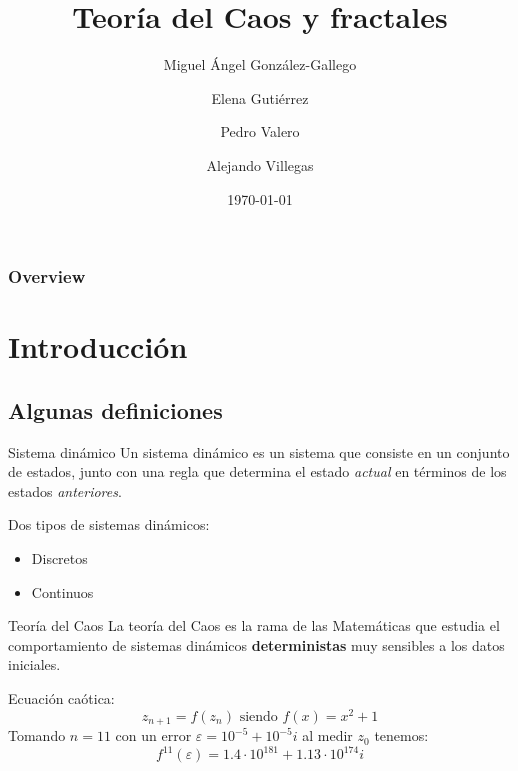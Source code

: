 \documentclass[8pt]{beamer}
\title[CyC]{Teoría del Caos y fractales} %
\author[]{Miguel Ángel González-Gallego \and Elena Gutiérrez \and Pedro Valero \and Alejando Villegas} %
\institute[UAM] %
{
Universidad Autónoma de Madrid\\ %
\medskip
\textit{Complejidad y Computación}
}
\date{\today} %
\begin{document}
\begin{frame}
\titlepage %
\end{frame}


\begin{frame}
\frametitle{Overview} %
\setcounter{tocdepth}{3}
\begin{multicols}{2}
\tableofcontents
\end{multicols}
\end{frame}


\section{Introducción}
\subsection{Algunas definiciones}
\begin{frame}

\begin{block}{Sistema dinámico}\label{def:sistemaDinamico}
Un sistema dinámico es un sistema que consiste en un conjunto de estados, junto con una regla que determina el estado \emph{actual} en términos de los estados \emph{anteriores}.
\end{block}

Dos tipos de sistemas dinámicos:
\begin{itemize}
\item Discretos
\item Continuos
\end{itemize}

\begin{block}{Teoría del Caos}
La teoría del Caos es la rama de las Matemáticas que estudia el comportamiento de sistemas dinámicos \textbf{deterministas} muy sensibles a los datos iniciales.
\end{block}

\begin{example}
Ecuación caótica:
\[z_{n+1} = f(z_n) \text{ siendo } f(x) = x^2+1\]
Tomando $n=11$ con un error $ε=10^{-5}+10^{-5}i$ al medir $z_0$ tenemos:
\[f^{11}(ε)=1.4 \cdot 10^{181} + 1.13\cdot 10^{174}i\]
\end{example}
\end{frame}
\end{document}
